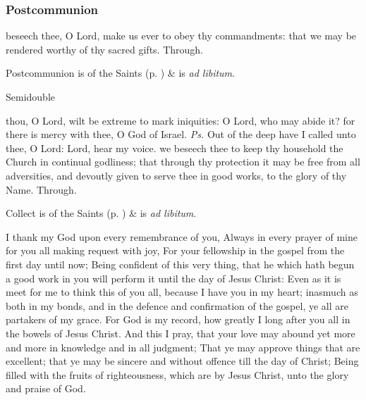 \subsubsection{Postcommunion}
 beseech thee, O Lord, make us ever to obey thy commandments: that we may be rendered worthy of thy sacred gifts. Through.

\vspace{0.25ex}

\begin{rubric}
     Postcommunion is of the Saints (p. \pageref{SPSaints}) \&  is \emph{ad libitum}.
\end{rubric}


\begin{inhead}
{Semidouble}
\end{inhead}

\properantiphonfix

\introit
{} thou, O Lord, wilt be extreme to mark iniquities: O Lord, who may abide it? for there is mercy with thee, O God of Israel. \textit{Ps.} Out of the deep have I called unto thee, O Lord: Lord, hear my voice.
\collect
{} we beseech thee to keep thy household the Church in continual godliness; that through thy protection it may be free from all adversities, and devoutly given to serve thee in good works, to the glory of thy Name. Through.
\begin{rubric}
     Collect is of the Saints (p. \pageref{SPSaints}) \&  is \emph{ad libitum}.
\end{rubric}

 I thank my God upon every remembrance of you, Always in every prayer of mine for you all making request with joy, For your fellowship in the gospel from the first day until now; Being confident of this very thing, that he which hath begun a good work in you will perform it until the day of Jesus Christ: Even as it is meet for me to think this of you all, because I have you in my heart; inasmuch as both in my bonds, and in the defence and confirmation of the gospel, ye all are partakers of my grace. For God is my record, how greatly I long after you all in the bowels of Jesus Christ. And this I pray, that your love may abound yet more and more in knowledge and in all judgment; That ye may approve things that are excellent; that ye may be sincere and without offence till the day of Christ; Being filled with the fruits of righteousness, which are by Jesus Christ, unto the glory and praise of God.


